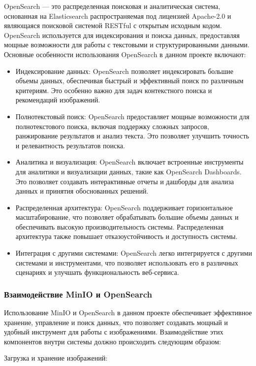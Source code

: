 OpenSearch — это распределенная поисковая и аналитическая система, основанная на Elasticsearch распространяемая под лицензией Apache-2.0 и являющаяся поисковой системой RESTful с открытым исходным кодом. OpenSearch используется для индексирования и поиска данных, предоставляя мощные возможности для работы с текстовыми и структурированными данными. Основные особенности использования OpenSearch в данном проекте включают:

\begin{itemize}
	\item Индексирование данных: OpenSearch позволяет индексировать большие объемы данных, обеспечивая быстрый и эффективный поиск по различным критериям. Это особенно важно для задач контекстного поиска и рекомендаций изображений.
	\item Полнотекстовый поиск: OpenSearch предоставляет мощные возможности для полнотекстового поиска, включая поддержку сложных запросов, ранжирование результатов и анализ текста. Это позволяет улучшить точность и релевантность результатов поиска.
	\item Аналитика и визуализация: OpenSearch включает встроенные инструменты для аналитики и визуализации данных, такие как OpenSearch Dashboards. Это позволяет создавать интерактивные отчеты и дашборды для анализа данных и принятия обоснованных решений.
	\item Распределенная архитектура: OpenSearch поддерживает горизонтальное масштабирование, что позволяет обрабатывать большие объемы данных и обеспечивать высокую производительность системы. Распределенная архитектура также повышает отказоустойчивость и доступность системы.
	\item Интеграция с другими системами: OpenSearch легко интегрируется с другими системами и инструментами, что позволяет использовать его в различных сценариях и улучшать функциональность веб-сервиса.
\end{itemize}

\subsubsection{Взаимодействие MinIO и OpenSearch}

Использование MinIO и OpenSearch в данном проекте обеспечивает эффективное хранение, управление и поиск данных, что позволяет создавать мощный и удобный инструмент для работы с изображениями. Взаимодействие этих компонентов внутри системы должно происходить следующим образом:

Загрузка и хранение изображений:

